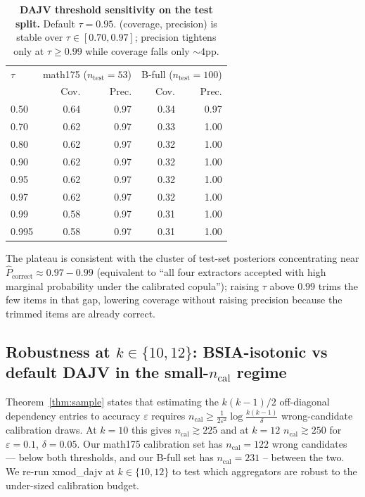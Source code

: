 \begin{table}[h]
\centering
\caption{\textbf{DAJV threshold sensitivity on the test split.} Default
$\tau = 0.95$. (coverage, precision) is stable over $\tau \in
[0.70, 0.97]$; precision tightens only at $\tau \geq 0.99$ while
coverage falls only $\sim 4$pp.}
\label{tab:threshold_sensitivity}
\small
\begin{tabular}{lrrrr}
\toprule
$\tau$ & \multicolumn{2}{c}{math175 ($n_{\text{test}} = 53$)}
       & \multicolumn{2}{c}{B-full ($n_{\text{test}} = 100$)} \\
       & Cov.   & Prec. & Cov.   & Prec. \\
\midrule
0.50  & 0.64 & 0.97 & 0.34 & 0.97 \\
0.70  & 0.62 & 0.97 & 0.33 & 1.00 \\
0.80  & 0.62 & 0.97 & 0.32 & 1.00 \\
0.90  & 0.62 & 0.97 & 0.32 & 1.00 \\
0.95  & 0.62 & 0.97 & 0.32 & 1.00 \\
0.97  & 0.62 & 0.97 & 0.32 & 1.00 \\
0.99  & 0.58 & 0.97 & 0.31 & 1.00 \\
0.995 & 0.58 & 0.97 & 0.31 & 1.00 \\
\bottomrule
\end{tabular}
\end{table}

The plateau is consistent with the cluster of test-set posteriors
concentrating near $\hat P_{\text{correct}} \approx 0.97{-}0.99$
(equivalent to ``all four extractors accepted with high marginal
probability under the calibrated copula''); raising $\tau$ above
$0.99$ trims the few items in that gap, lowering coverage without
raising precision because the trimmed items are already correct.

\subsection{Robustness at $k \in \{10, 12\}$: BSIA-isotonic vs
default DAJV in the small-$n_{\text{cal}}$ regime}
\label{app:k10_robustness}

Theorem~\ref{thm:sample} states that estimating the
$k(k-1)/2$ off-diagonal dependency entries to accuracy $\varepsilon$
requires $n_{\text{cal}} \geq \frac{1}{2\varepsilon^2} \log
\frac{k(k-1)}{\delta}$ wrong-candidate calibration draws.  At
$k=10$ this gives $n_{\text{cal}} \gtrsim 225$ and at $k=12$
$n_{\text{cal}} \gtrsim 250$ for $\varepsilon = 0.1$,
$\delta = 0.05$.  Our math175 calibration set has $n_{\text{cal}}
= 122$ wrong candidates --- below both thresholds, and our B-full
set has $n_{\text{cal}} = 231$ -- between the two.  We re-run
xmod\_dajv at $k \in \{10, 12\}$ to test which aggregators are
robust to the under-sized calibration budget.


